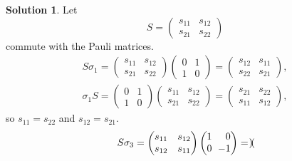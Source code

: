 \documentclass[11pt, a4paper]{report}
\theoremstyle{definition}
\newtheorem{solution}{Solution}[part]
\newenvironment{sol}{\begin{solution}}{\end{solution}\pagebreak[3]}
\newcommand*{\settightmatrix}{\ensuremath\setlength{\arraycolsep}{0.7ex}}
\newenvironment{tightmatrix}
    {\settightmatrix}{}
\begin{document}
\begin{sol}

Let
\[
    S = \begin{pmatrix}
            s_{11} & s_{12} \\
            s_{21} & s_{22}
        \end{pmatrix}
\]
commute with the Pauli matrices.
\begin{gather*}
    S \sigma_1 =
        \begin{pmatrix}
            s_{11} & s_{12} \\
            s_{21} & s_{22}
        \end{pmatrix}
        \begin{pmatrix}
            0 & 1 \\
            1 & 0
        \end{pmatrix}
        =
        \begin{pmatrix}
            s_{12} & s_{11} \\
            s_{22} & s_{21}
        \end{pmatrix}, \\
    \sigma_1 S =
        \begin{pmatrix}
            0 & 1 \\
            1 & 0
        \end{pmatrix}
        \begin{pmatrix}
            s_{11} & s_{12} \\
            s_{21} & s_{22}
        \end{pmatrix}
        =
        \begin{pmatrix}
            s_{21} & s_{22} \\
            s_{11} & s_{12}
        \end{pmatrix},
\end{gather*}
so $s_{11} = s_{22}$ and $s_{12} = s_{21}$.
\begin{gather*}
    S \sigma_3 =
        \begin{pmatrix}
            s_{11} & s_{12} \\
            s_{12} & s_{11}
        \end{pmatrix}
        \begin{tightmatrix}\begin{pmatrix*}[r]
            1 &  0 \\
            0 & -1
        \end{pmatrix*}\end{tightmatrix}
        =
        \begin{tightmatrix}\begin{pmatrix*}[r]

\end{pmatrix*}
\end{tightmatrix}
\end{gather*}
\end{sol}
\end{document}
